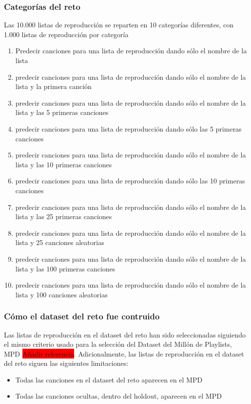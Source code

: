 \documentclass{article}
\begin{document}
	\subsubsection{Categorías del reto}
	Las 10.000 listas de reproducción se reparten en 10 categorías diferentes, con 1.000 listas de reproducción por categoría
	\begin{enumerate}
		\item Predecir canciones para una lista de reproducción dando sólo el nombre de la lista
		\item predecir canciones para una lista de reproducción dando sólo el nombre de la lista y la primera canción
		\item predecir canciones para una lista de reproducción dando sólo el nombre de la lista y las 5 primeras canciones
		\item predecir canciones para una lista de reproducción dando sólo las 5 primeras canciones
		\item predecir canciones para una lista de reproducción dando sólo el nombre de la lista y las 10 primeras canciones
		\item predecir canciones para una lista de reproducción dando sólo las 10 primeras canciones
		\item predecir canciones para una lista de reproducción dando sólo el nombre de la lista y las 25 primeras canciones
		\item predecir canciones para una lista de reproducción dando sólo el nombre de la lista y 25 canciones aleatorias
		\item predecir canciones para una lista de reproducción dando sólo el nombre de la lista y las 100 primeras canciones
		\item predecir canciones para una lista de reproducción dando sólo el nombre de la lista y 100 canciones aleatorias
	\end{enumerate}
	\subsubsection{Cómo el dataset del reto fue contruido}
	Las listas de reproducción en el dataset del reto han sido seleccionadas siguiendo el mismo criterio usado para la selección del Dataset del Millón de Playlists, MPD  \colorbox{red}{Añadir referencia}. Adicionalmente, las listas de reproducción en el dataset del reto siguen las siguientes limitaciones:
	\begin{itemize}
		\item Todas las canciones en el dataset del reto aparecen en el MPD
		\item Todas las canciones ocultas, dentro del holdout, aparecen en el MPD
	\end{itemize}
\end{document}
